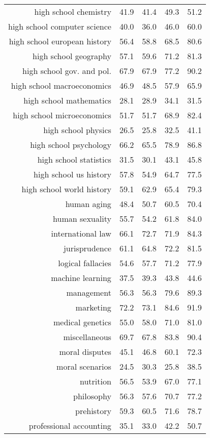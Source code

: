 \documentclass[10pt]{article} \usepackage[preprint]{tmlr}
\begin{document}
\begin{table*}
{\begin{tabular}{r cccc}
high school chemistry	&	41.9	&	41.4	&	49.3	&	51.2	\\
high school computer science	&	40.0	&	36.0	&	46.0	&	60.0	\\
high school european history	&	56.4	&	58.8	&	68.5	&	80.6	\\
high school geography	&	57.1	&	59.6	&	71.2	&	81.3	\\
high school gov. and pol.	&	67.9	&	67.9	&	77.2	&	90.2	\\
high school macroeconomics	&	46.9	&	48.5	&	57.9	&	65.9	\\
high school mathematics	&	28.1	&	28.9	&	34.1	&	31.5	\\
high school microeconomics	&	51.7	&	51.7	&	68.9	&	82.4	\\
high school physics	&	26.5	&	25.8	&	32.5	&	41.1	\\
high school psychology	&	66.2	&	65.5	&	78.9	&	86.8	\\
high school statistics	&	31.5	&	30.1	&	43.1	&	45.8	\\
high school us history	&	57.8	&	54.9	&	64.7	&	77.5	\\
high school world history	&	59.1	&	62.9	&	65.4	&	79.3	\\
human aging	&	48.4	&	50.7	&	60.5	&	70.4	\\
human sexuality	&	55.7	&	54.2	&	61.8	&	84.0	\\
international law	&	66.1	&	72.7	&	71.9	&	84.3	\\
jurisprudence	&	61.1	&	64.8	&	72.2	&	81.5	\\
logical fallacies	&	54.6	&	57.7	&	71.2	&	77.9	\\
machine learning	&	37.5	&	39.3	&	43.8	&	44.6	\\
management	&	56.3	&	56.3	&	79.6	&	89.3	\\
marketing	&	72.2	&	73.1	&	84.6	&	91.9	\\
medical genetics	&	55.0	&	58.0	&	71.0	&	81.0	\\
miscellaneous	&	69.7	&	67.8	&	83.8	&	90.4	\\
moral disputes	&	45.1	&	46.8	&	60.1	&	72.3	\\
moral scenarios	&	24.5	&	30.3	&	25.8	&	38.5	\\
nutrition	&	56.5	&	53.9	&	67.0	&	77.1	\\
philosophy	&	56.3	&	57.6	&	70.7	&	77.2	\\
prehistory	&	59.3	&	60.5	&	71.6	&	78.7	\\
professional accounting	&	35.1	&	33.0	&	42.2	&	50.7	\\

\end{tabular}}
\end{table*}
\end{document}
